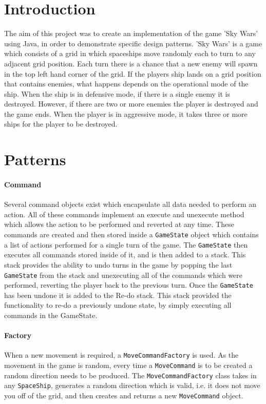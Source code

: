 \documentclass{article}
\newcommand{\classname}[1]{\texttt{#1}}
\begin{document}
	\begin{multicols}{2}
  		
  		\section{Introduction}
  			The aim of this project was to create an implementation of the game 'Sky Wars' using Java, in order to demonstrate specific design patterns. 'Sky Wars' is a game which consists of a grid in which spaceships move randomly each to turn to any adjacent grid position. Each turn there is a chance that a new enemy will spawn in the top left hand corner of the grid. If the players ship lands on a grid position that contains enemies, what happens depends on the operational mode of the ship. When the ship is in defensive mode, if there is a single enemy it is destroyed. However, if there are two or more enemies the player is destroyed and the game ends. When the player is in aggressive mode, it takes three or more ships for the player to be destroyed.
  		\section{Patterns}
  		\paragraph{Command}
  			Several command objects exist which encapsulate all data needed to perform an action. All of these commands implement an execute and unexecute method which allows the action to be performed and reverted at any time. These commands are created and then stored inside a \classname{GameState} object which contains a list of actions performed for a single turn of the game. The \classname{GameState} then executes all commands stored inside of it, and is then added to a stack. This stack provides the ability to undo turns in the game by popping the last \classname{GameState} from the stack and unexecuting all of the commands which were performed, reverting the player back to the previous turn. Once the \classname{GameState} has been undone it is added to the Re-do stack. This stack provided the functionality to re-do a previously undone state, by simply executing all commands in the GameState.
  		\paragraph{Factory}
  			When a new movement is required, a \classname{MoveCommandFactory} is used. As the movement in the game is random, every time a \classname{MoveCommand} is to be created a random direction needs to be produced. The \classname{MoveCommandFactory} class takes in any \classname{SpaceShip}, generates a random direction which is valid, i.e. it does not move you off of the grid, and then creates and returns a new \classname{MoveCommand} object. 

\end{multicols}
\end{document}
